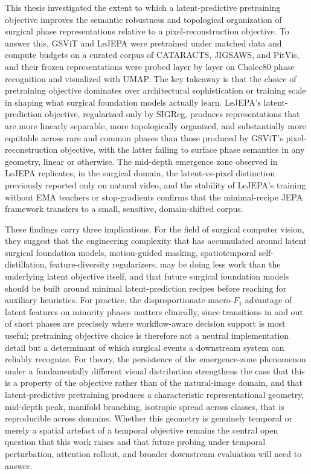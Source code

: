 \documentclass[11pt, a4paper]{article}
\begin{document}
This thesis investigated the extent to which a latent-predictive pretraining objective improves the semantic robustness and topological organization of surgical phase representations relative to a pixel-reconstruction objective. To answer this, GSViT and LeJEPA were pretrained under matched data and compute budgets on a curated corpus of CATARACTS, JIGSAWS, and PitVis, and their frozen representations were probed layer by layer on Cholec80 phase recognition and visualized with UMAP. The key takeaway is that the choice of pretraining objective dominates over architectural sophistication or training scale in shaping what surgical foundation models actually learn. LeJEPA's latent-prediction objective, regularized only by SIGReg, produces representations that are more linearly separable, more topologically organized, and substantially more equitable across rare and common phases than those produced by GSViT's pixel-reconstruction objective, with the latter failing to surface phase semantics in any geometry, linear or otherwise. The mid-depth emergence zone observed in LeJEPA replicates, in the surgical domain, the latent-vs-pixel distinction previously reported only on natural video, and the stability of LeJEPA's training without EMA teachers or stop-gradients confirms that the minimal-recipe JEPA framework transfers to a small, sensitive, domain-shifted corpus.

These findings carry three implications. For the field of surgical computer vision, they suggest that the engineering complexity that has accumulated around latent surgical foundation models, motion-guided masking, spatiotemporal self-distillation, feature-diversity regularizers, may be doing less work than the underlying latent objective itself, and that future surgical foundation models should be built around minimal latent-prediction recipes before reaching for auxiliary heuristics. For practice, the disproportionate macro-$F_1$ advantage of latent features on minority phases matters clinically, since transitions in and out of short phases are precisely where workflow-aware decision support is most useful; pretraining objective choice is therefore not a neutral implementation detail but a determinant of which surgical events a downstream system can reliably recognize. For theory, the persistence of the emergence-zone phenomenon under a fundamentally different visual distribution strengthens the case that this is a property of the objective rather than of the natural-image domain, and that latent-predictive pretraining produces a characteristic representational geometry, mid-depth peak, manifold branching, isotropic spread across classes, that is reproducible across domains. Whether this geometry is genuinely temporal or merely a spatial artefact of a temporal objective remains the central open question that this work raises and that future probing under temporal perturbation, attention rollout, and broader downstream evaluation will need to answer.
\end{document}
